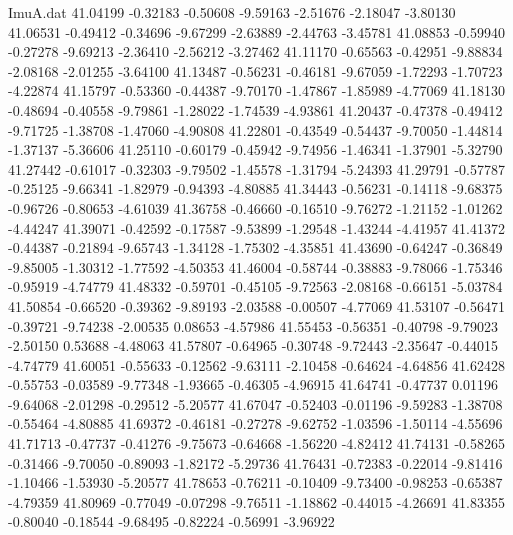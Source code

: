 \begin{filecontents}{ImuA.dat}
  41.04199   -0.32183   -0.50608   -9.59163   -2.51676   -2.18047   -3.80130
  41.06531   -0.49412   -0.34696   -9.67299   -2.63889   -2.44763   -3.45781
  41.08853   -0.59940   -0.27278   -9.69213   -2.36410   -2.56212   -3.27462
  41.11170   -0.65563   -0.42951   -9.88834   -2.08168   -2.01255   -3.64100
  41.13487   -0.56231   -0.46181   -9.67059   -1.72293   -1.70723   -4.22874
  41.15797   -0.53360   -0.44387   -9.70170   -1.47867   -1.85989   -4.77069
  41.18130   -0.48694   -0.40558   -9.79861   -1.28022   -1.74539   -4.93861
  41.20437   -0.47378   -0.49412   -9.71725   -1.38708   -1.47060   -4.90808
  41.22801   -0.43549   -0.54437   -9.70050   -1.44814   -1.37137   -5.36606
  41.25110   -0.60179   -0.45942   -9.74956   -1.46341   -1.37901   -5.32790
  41.27442   -0.61017   -0.32303   -9.79502   -1.45578   -1.31794   -5.24393
  41.29791   -0.57787   -0.25125   -9.66341   -1.82979   -0.94393   -4.80885
  41.34443   -0.56231   -0.14118   -9.68375   -0.96726   -0.80653   -4.61039
  41.36758   -0.46660   -0.16510   -9.76272   -1.21152   -1.01262   -4.44247
  41.39071   -0.42592   -0.17587   -9.53899   -1.29548   -1.43244   -4.41957
  41.41372   -0.44387   -0.21894   -9.65743   -1.34128   -1.75302   -4.35851
  41.43690   -0.64247   -0.36849   -9.85005   -1.30312   -1.77592   -4.50353
  41.46004   -0.58744   -0.38883   -9.78066   -1.75346   -0.95919   -4.74779
  41.48332   -0.59701   -0.45105   -9.72563   -2.08168   -0.66151   -5.03784
  41.50854   -0.66520   -0.39362   -9.89193   -2.03588   -0.00507   -4.77069
  41.53107   -0.56471   -0.39721   -9.74238   -2.00535    0.08653   -4.57986
  41.55453   -0.56351   -0.40798   -9.79023   -2.50150    0.53688   -4.48063
  41.57807   -0.64965   -0.30748   -9.72443   -2.35647   -0.44015   -4.74779
  41.60051   -0.55633   -0.12562   -9.63111   -2.10458   -0.64624   -4.64856
  41.62428   -0.55753   -0.03589   -9.77348   -1.93665   -0.46305   -4.96915
  41.64741   -0.47737    0.01196   -9.64068   -2.01298   -0.29512   -5.20577
  41.67047   -0.52403   -0.01196   -9.59283   -1.38708   -0.55464   -4.80885
  41.69372   -0.46181   -0.27278   -9.62752   -1.03596   -1.50114   -4.55696
  41.71713   -0.47737   -0.41276   -9.75673   -0.64668   -1.56220   -4.82412
  41.74131   -0.58265   -0.31466   -9.70050   -0.89093   -1.82172   -5.29736
  41.76431   -0.72383   -0.22014   -9.81416   -1.10466   -1.53930   -5.20577
  41.78653   -0.76211   -0.10409   -9.73400   -0.98253   -0.65387   -4.79359
  41.80969   -0.77049   -0.07298   -9.76511   -1.18862   -0.44015   -4.26691
  41.83355   -0.80040   -0.18544   -9.68495   -0.82224   -0.56991   -3.96922

\end{filecontents}
